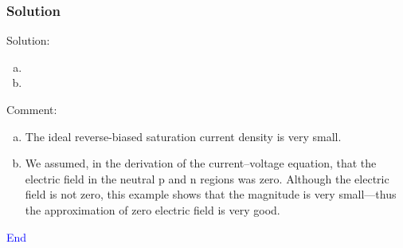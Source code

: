 \documentclass{beamer}
\begin{document}
    \begin{frame} \frametitle{Solution}
        Solution:
        \begin{enumerate}[a)]
            \item {} 
            \item \fbox{\textcolor{white}{$E = 1.525 V/cm$}}
        \end{enumerate}
        \par Comment:
        \begin{enumerate}[a)]
            \item The ideal reverse-biased saturation current density is very small.
            \item We assumed, in the derivation of the current–voltage equation, that the electric field in the neutral p and n regions was zero. Although the electric field is not zero, this example shows that the magnitude is very small—thus the approximation of zero electric field is very good.
        \end{enumerate}
    \end{frame}

    \begin{frame} 
        \begin{center}
            \Large\textcolor{blue}{End}
        \end{center}
    \end{frame}
\end{document}
